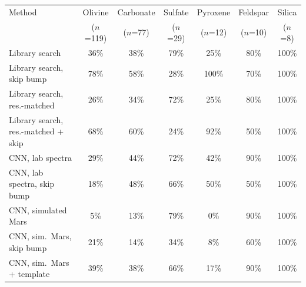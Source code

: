 \begin{tabular}{lcccccc}
\toprule
Method & Olivine & Carbonate & Sulfate & Pyroxene & Feldspar & Silica\\
 & ($n$=119) & ($n$=77) & ($n$=29) & ($n$=12) & ($n$=10) & ($n$=8)\\
\midrule
Library search & 36\% & 38\% & 79\% & 25\% & 80\% & 100\%\\
Library search, skip bump & 78\% & 58\% & 28\% & 100\% & 70\% & 100\%\\
Library search, res.-matched & 26\% & 34\% & 72\% & 25\% & 80\% & 100\%\\
Library search, res.-matched + skip & 68\% & 60\% & 24\% & 92\% & 50\% & 100\%\\
CNN, lab spectra & 29\% & 44\% & 72\% & 42\% & 90\% & 100\%\\
CNN, lab spectra, skip bump & 18\% & 48\% & 66\% & 50\% & 50\% & 100\%\\
CNN, simulated Mars & 5\% & 13\% & 79\% & 0\% & 90\% & 100\%\\
CNN, sim.\ Mars, skip bump & 21\% & 14\% & 34\% & 8\% & 60\% & 100\%\\
CNN, sim.\ Mars + template & 39\% & 38\% & 66\% & 17\% & 90\% & 100\%\\
\bottomrule
\end{tabular}
